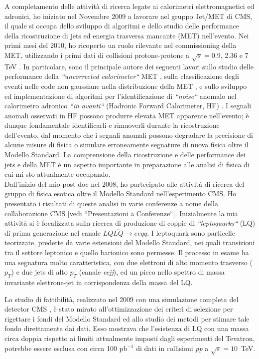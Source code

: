 \documentclass[10pt, a4paper]{article}
\begin{document}
A completamento delle attivit\`a di ricerca legate ai calorimetri elettromagnetici ed adronici, ho iniziato nel Novembre 2009 a 
lavorare nel gruppo Jet/MET di CMS, il quale si occupa dello sviluppo di algoritmi e dello studio delle performance della ricostruzione 
di jets ed energia trasversa mancante (MET) nell'evento. Nei primi mesi del 2010, ho ricoperto un ruolo rilevante nel commissioning 
della MET, utilizzando i primi dati di collisioni protone-protone a $\sqrt{s}=$0.9, 2.36 e 7 TeV \cite{JME-10-004,JME-10-002}.
In particolare, sono il principale autore dei seguenti lavori sullo studio delle performance della {\it ``uncorrected calorimeter``} 
MET \cite{AN-2010-029},  sulla classificazione degli eventi nelle code non gaussiane nella distribuzione della MET \cite{AN-2010-219}, 
e sullo sviluppo ed implementazione di algoritmi per l'identificazione di {\it ``noise``} anomalo nel calorimetro 
adronico {\it ``in avanti``} (Hadronic Forward Calorimeter, HF) \cite{DN-2010-008}. I segnali anomali 
osservati in HF possono produrre elevata MET apparente nell'evento; \`e dunque fondamentale 
identificarli e rimuoverli durante la ricostruzione dell'evento, dal momento che i segnali anomali possono 
degradare la precisione di alcune misure di fisica o simulare erroneamente segnature di nuova fisica oltre il Modello Standard. 
La comprensione della ricostruzione e delle performance dei jets e della MET \`e un aspetto importante 
in preparazione alle analisi di fisica di cui mi sto attualmente occupando. \\

Dall'inizio del mio post-doc nel 2008, ho partecipato alle attivit\`a di ricerca del gruppo di fisica esotica oltre il 
Modello Standard nell'esperimento CMS. Ho presentato i risultati di queste analisi in varie conferenze  
a nome della collaborazione CMS [vedi ``Presentazioni a Conferenze``]. Inizialmente la mia attivit\`a si \`e focalizzata sulla ricerca 
di produzione di coppie di {\it ``leptoquarks``} (LQ) di prima generazione nel canale $LQ\overline{LQ} \rightarrow ee qq$. 
I leptoquark sono particelle teorizzate, predette da varie estensioni del Modello Standard, nei quali transizioni tra il settore leptonico 
e quello barionico sono permesse. Il processo in esame ha una segnatura molto caratteristica, con due elettroni di alto momento 
trasverso ($p_T$) e due jets di alto $p_T$ (canale {\it eejj}), ed un picco nello spettro di massa invariante elettrone-jet in corrispondenza 
della massa del LQ. 

Lo studio di fattibilit\`a, realizzato nel 2009 con una simulazione completa del detector CMS \cite{AN-2008-070,EXO-08-010}, 
\`e stato mirato all'ottimizzazione dei criteri di selezione per rigettare i fondi del Modello Standard ed allo studio dei metodi per stimare tale 
fondo direttamente dai dati. Esso mostrava che l'esistenza di LQ con una massa circa doppia rispetto ai limiti attualmente imposti dagli esperimenti 
del Tevatron, potrebbe essere esclusa con circa 100 pb$^{-1}$ di dati in collisioni {\it pp} a $\sqrt{s}=10$~TeV. 
\end{document}
